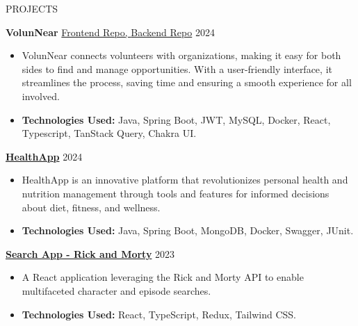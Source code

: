 \documentclass{resume}
\begin{document}
\begin{rSection}{PROJECTS}

\textbf{VolunNear} 
\href{https://github.com/Asnvir/VolunNear-frontend}{Frontend Repo, } 
\href{https://github.com/Asnvir/VolunNear-backend}{Backend Repo} \hfill 2024\hspace*{1em}
\begin{itemize}
    \item VolunNear connects volunteers with organizations, making it easy for both sides to find and manage opportunities. With a user-friendly interface, it streamlines the process, saving time and ensuring a smooth experience for all involved.
    \item \textbf{Technologies Used:} Java, Spring Boot, JWT, MySQL, Docker, React, Typescript, TanStack Query, Chakra UI.
\end{itemize}

\vspace{0.25em}

\textbf{\href{https://github.com/Asnvir/HealthApp}{HealthApp}} \hfill 2024\hspace*{1em}

\begin{itemize}
    \item HealthApp is an innovative platform that revolutionizes personal health and nutrition management through tools and features for informed decisions about diet, fitness, and wellness.
    \item \textbf{Technologies Used:} Java, Spring Boot, MongoDB, Docker, Swagger, JUnit.
\end{itemize}

\vspace{0.25em}

\textbf{\href{https://github.com/Asnvir/React-TS-RickMorty}{Search App - Rick and Morty}}  \hfill 2023\hspace*{1em} 

\begin{itemize}
    \item A React application leveraging the Rick and Morty API to enable multifaceted character and episode searches.
    \item \textbf{Technologies Used:} React, TypeScript, Redux, Tailwind CSS.
\end{itemize}

\end{rSection}


\vspace{80pt}
\end{document}

